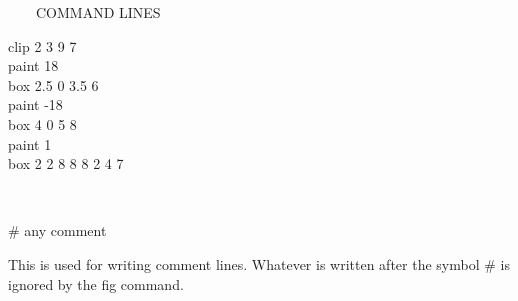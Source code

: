 \begin{qsection}{\ ~~~COMMAND LINES}
\begin{minipage}[t]{9cm}
\begin{minipage}[b]{4.5cm}
\vspace*{3mm}
clip 2 3 9 7\\
paint 18\\
box 2.5 0 3.5 6\\
paint -18 \\
box 4 0 5 8\\
paint 1\\
box  2 2 8 8 8 2 4 7
\end{minipage}
\end{minipage}\\

\begin{minipage}[t]{5.5cm}
\# any comment
\end{minipage}
\begin{minipage}[t]{9cm}
This is used for writing comment lines.
Whatever is written after the symbol $\#$
is ignored by the fig command.
\end{minipage}\\
\end{qsection}

